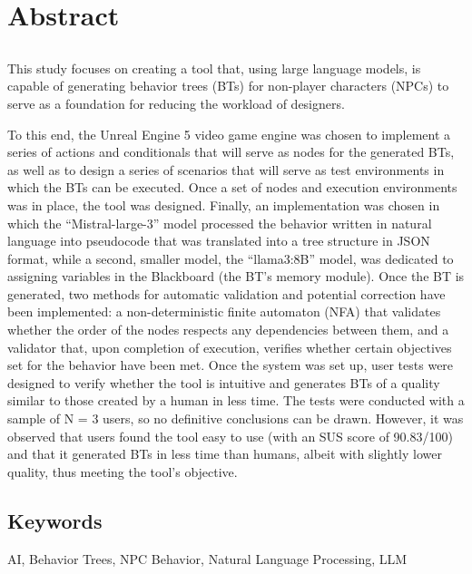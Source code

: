 \chapter*{Abstract}

\section*{\tituloPortadaEngVal}
 
This study focuses on creating a tool that, using large language models, is capable of generating behavior trees (BTs) for non-player characters (NPCs) to serve as a foundation for reducing the workload of designers.

To this end, the Unreal Engine 5 video game engine was chosen to implement a series of actions and conditionals that will serve as nodes for the generated BTs, as well as to design a series of scenarios that will serve as test environments in which the BTs can be executed.
Once a set of nodes and execution environments was in place, the tool was designed.
Finally, an implementation was chosen in which the “Mistral-large-3” model processed the behavior written in natural language into pseudocode that was translated into a tree structure in JSON format, while a second, smaller model, the “llama3:8B” model, was dedicated to assigning variables in the Blackboard (the BT’s memory module).
Once the BT is generated, two methods for automatic validation and potential correction have been implemented: a non-deterministic finite automaton (NFA) that validates whether the order of the nodes respects any dependencies between them, and a validator that, upon completion of execution, verifies whether certain objectives set for the behavior have been met.
Once the system was set up, user tests were designed to verify whether the tool is intuitive and generates BTs of a quality similar to those created by a human in less time.
The tests were conducted with a sample of N = 3 users, so no definitive conclusions can be drawn.
However, it was observed that users found the tool easy to use (with an SUS score of 90.83/100) and that it generated BTs in less time than humans, albeit with slightly lower quality, thus meeting the tool’s objective.

\section*{Keywords}

\noindent AI, Behavior Trees, NPC Behavior, Natural Language Processing, LLM 




